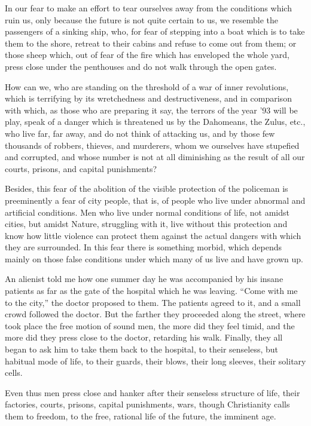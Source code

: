 \documentclass{book}
\begin{document}
In our fear to make an effort to tear ourselves away from the conditions which ruin us, only because the future is not quite certain to us, we resemble the passengers of a sinking ship, who, for fear of stepping into a boat which is to take them to the shore, retreat to their cabins and refuse to come out from them; or those sheep which, out of fear of the fire which has enveloped the whole yard, press close under the penthouses and do not walk through the open gates.

How can we, who are standing on the threshold of a war of inner revolutions, which is terrifying by its wretchedness and destructiveness, and in comparison with which, as those who are preparing it say, the terrors of the year ’93 will be play, speak of a danger which is threatened us by the Dahomeans, the Zulus, etc., who live far, far away, and do not think of attacking us, and by those few thousands of robbers, thieves, and murderers, whom we ourselves have stupefied and corrupted, and whose number is not at all diminishing as the result of all our courts, prisons, and capital punishments?

Besides, this fear of the abolition of the visible protection of the policeman is preeminently a fear of city people, that is, of people who live under abnormal and artificial conditions. Men who live under normal conditions of life, not amidst cities, but amidst Nature, struggling with it, live without this protection and know how little violence can protect them against the actual dangers with which they are surrounded. In this fear there is something morbid, which depends mainly on those false conditions under which many of us live and have grown up.

An alienist told me how one summer day he was accompanied by his insane patients as far as the gate of the hospital which he was leaving. “Come with me to the city,” the doctor proposed to them. The patients agreed to it, and a small crowd followed the doctor. But the farther they proceeded along the street, where took place the free motion of sound men, the more did they feel timid, and the more did they press close to the doctor, retarding his walk. Finally, they all began to ask him to take them back to the hospital, to their senseless, but habitual mode of life, to their guards, their blows, their long sleeves, their solitary cells.

Even thus men press close and hanker after their senseless structure of life, their factories, courts, prisons, capital punishments, wars, though Christianity calls them to freedom, to the free, rational life of the future, the imminent age.
\end{document}
